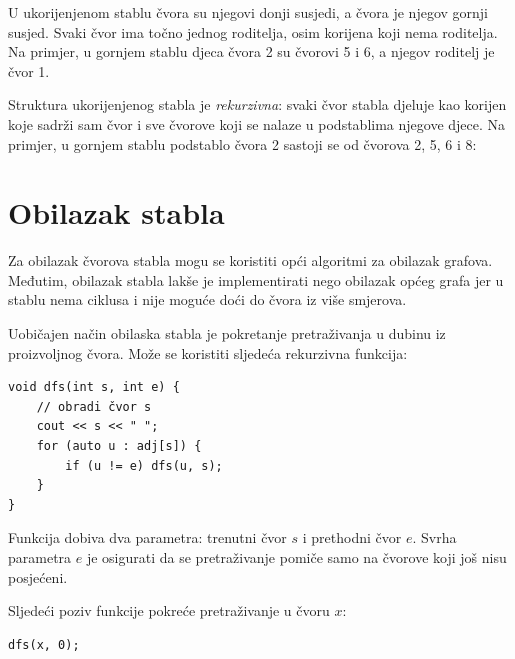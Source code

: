 U ukorijenjenom stablu  čvora
su njegovi donji susjedi, a  čvora
je njegov gornji susjed.
Svaki čvor ima točno jednog roditelja,
osim korijena koji nema roditelja.
Na primjer, u gornjem stablu
djeca čvora 2 su čvorovi 5 i 6,
a njegov roditelj je čvor 1.


Struktura ukorijenjenog stabla je \emph{rekurzivna}:
svaki čvor stabla djeluje kao korijen 
koje sadrži sam čvor i sve čvorove
koji se nalaze u podstablima njegove djece.
Na primjer, u gornjem stablu podstablo čvora 2
sastoji se od čvorova 2, 5, 6 i 8:
\begin{center}
\end{center}

\section{Obilazak stabla}

Za obilazak čvorova stabla mogu se koristiti
opći algoritmi za obilazak grafova.
Međutim, obilazak stabla lakše je implementirati nego
obilazak općeg grafa jer
u stablu nema ciklusa i nije
moguće doći do čvora iz više smjerova.

Uobičajen način obilaska stabla je pokretanje
pretraživanja u dubinu iz proizvoljnog čvora.
Može se koristiti sljedeća rekurzivna funkcija:

\begin{lstlisting}
void dfs(int s, int e) {
    // obradi čvor s
    cout << s << " ";
    for (auto u : adj[s]) {
        if (u != e) dfs(u, s);
    }
}
\end{lstlisting}

Funkcija dobiva dva parametra: trenutni čvor $s$
i prethodni čvor $e$.
Svrha parametra $e$ je osigurati
da se pretraživanje pomiče samo na čvorove
koji još nisu posjećeni.

Sljedeći poziv funkcije pokreće pretraživanje
u čvoru $x$:

\begin{lstlisting}
dfs(x, 0);
\end{lstlisting}

